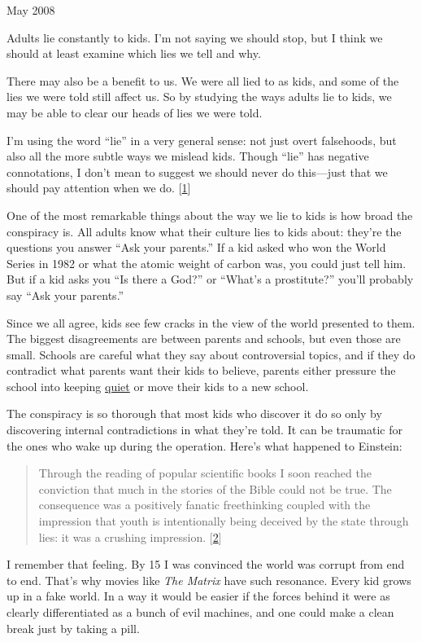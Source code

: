 May 2008

Adults lie constantly to kids. I'm not saying we should stop, but I
think we should at least examine which lies we tell and why.

There may also be a benefit to us. We were all lied to as kids, and some
of the lies we were told still affect us. So by studying the ways adults
lie to kids, we may be able to clear our heads of lies we were told.

I'm using the word ``lie'' in a very general sense: not just overt
falsehoods, but also all the more subtle ways we mislead kids. Though
``lie'' has negative connotations, I don't mean to suggest we should
never do this---just that we should pay attention when we do.
{[}\hyperref[f1n]{1}{]}

One of the most remarkable things about the way we lie to kids is how
broad the conspiracy is. All adults know what their culture lies to kids
about: they're the questions you answer ``Ask your parents.'' If a kid
asked who won the World Series in 1982 or what the atomic weight of
carbon was, you could just tell him. But if a kid asks you ``Is there a
God?'' or ``What's a prostitute?'' you'll probably say ``Ask your
parents.''

Since we all agree, kids see few cracks in the view of the world
presented to them. The biggest disagreements are between parents and
schools, but even those are small. Schools are careful what they say
about controversial topics, and if they do contradict what parents want
their kids to believe, parents either pressure the school into keeping
\href{http://www.google.com/search?q=parents+complain+inappropriate+book}{quiet}
or move their kids to a new school.

The conspiracy is so thorough that most kids who discover it do so only
by discovering internal contradictions in what they're told. It can be
traumatic for the ones who wake up during the operation. Here's what
happened to Einstein:

\begin{quote}
Through the reading of popular scientific books I soon reached the
conviction that much in the stories of the Bible could not be true. The
consequence was a positively fanatic freethinking coupled with the
impression that youth is intentionally being deceived by the state
through lies: it was a crushing impression. {[}\hyperref[f2n]{2}{]}
\end{quote}

I remember that feeling. By 15 I was convinced the world was corrupt
from end to end. That's why movies like \emph{The Matrix} have such
resonance. Every kid grows up in a fake world. In a way it would be
easier if the forces behind it were as clearly differentiated as a bunch
of evil machines, and one could make a clean break just by taking a
pill.


